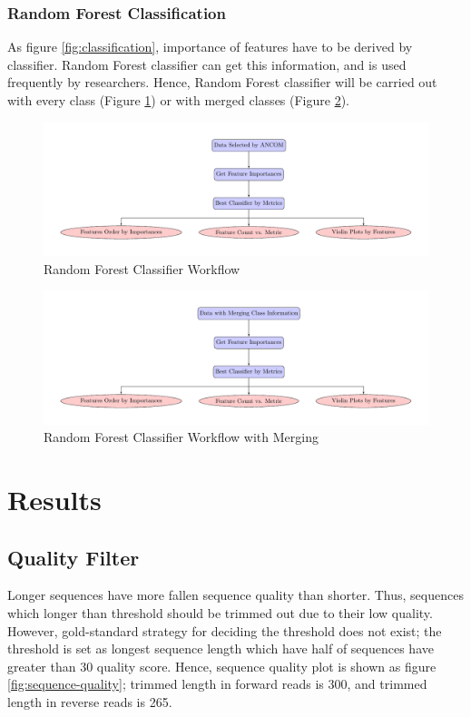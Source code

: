 \documentclass[a4paper]{article}
\begin{document}
            \subsubsection{Random Forest Classification}
                As figure \ref{fig:classification}, importance of features have to be derived by classifier. Random Forest classifier \cite{RandomForest1} can get this information, and is used frequently by researchers. Hence, Random Forest classifier will be carried out with every class (Figure \ref{fig:RF-whole-workflow}) or with merged classes (Figure \ref{fig:RF-merging-workflow}).

                \begin{figure}[p]
                    \centering
                    \includegraphics[width=0.6 \linewidth]{figures/RandomForest/whole.pdf}
                    \caption{Random Forest Classifier Workflow}
                    \label{fig:RF-whole-workflow}
                \end{figure}

                \begin{figure}[p]
                    \centering
                    \includegraphics[width=0.6 \linewidth]{figures/RandomForest/merge.pdf}
                    \caption{Random Forest Classifier Workflow with Merging}
                    \label{fig:RF-merging-workflow}
                \end{figure}

    \section{Results}
        \subsection{Quality Filter}
            Longer sequences have more fallen sequence quality than shorter. Thus, sequences which longer than threshold should be trimmed out due to their low quality. However, gold-standard strategy for deciding the threshold does not exist; the threshold is set as longest sequence length which have half of sequences have greater than 30 quality score. Hence, sequence quality plot is shown as figure \ref{fig:sequence-quality}; trimmed length in forward reads is 300, and trimmed length in reverse reads is 265.
\end{document}
